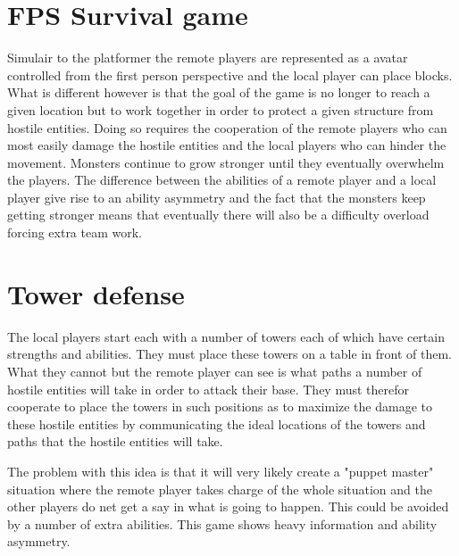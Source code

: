 \section{FPS Survival game}
Simulair to the platformer the remote players are represented
 as a avatar controlled from the first person perspective and 
 the local player can place blocks. What is different however 
 is that the goal of the game is no longer to reach a given 
 location but to work together in order to protect a given 
 structure from hostile entities. Doing so requires the 
 cooperation of the remote players who can most easily damage 
 the hostile entities and the local players who can hinder the
 movement. Monsters continue to grow stronger until they eventually 
 overwhelm the players. 
The difference between the abilities of a remote player and
a local player give rise to an ability asymmetry and the fact 
that the monsters keep getting stronger means that eventually 
there will also be a difficulty overload forcing extra 
team work. 

\section{Tower defense }
The local players start each with a number of towers each of 
which have certain strengths and abilities. They must place
 these towers on a table in front of them. What they cannot
 but the remote player can see is what paths a number of
 hostile entities will take in order to attack their base.
They must therefor cooperate to place the towers in such 
 positions as to maximize the damage to these hostile 
 entities by communicating the ideal locations of the 
 towers and paths that the hostile entities will take. 
 
 The problem with this idea is that it will very likely create a 
 "puppet master" situation where the remote player takes charge
 of the whole situation and the other players do net get a 
 say in what is going to happen. This could be avoided by a 
 number of extra abilities. This game shows heavy 
 information and ability asymmetry. 